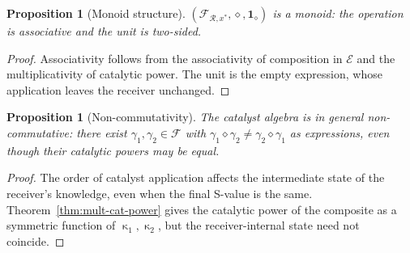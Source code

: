 \documentclass[twocolumn,11pt,a4paper]{article}
\theoremstyle{thmstyle}
\newtheorem{proposition}[theorem]{Proposition}
\theoremstyle{thmstyle}
\theoremstyle{definition}
\theoremstyle{remark}
\DeclareMathOperator{\catpow}{\kappa}
\newcommand{\Expr}{\mathcal{E}}
\newcommand{\receiver}{\mathcal{R}}
\newcommand{\Frame}{\mathcal{F}}
\begin{document}
\begin{proposition}[Monoid structure]\label{prop:monoid}
$(\Frame_{\receiver, x^{*}}, \diamond,
\mathbf{1}_{\diamond})$ is a monoid: the operation
is associative and the unit is two-sided.
\end{proposition}

\begin{proof}
Associativity follows from the associativity of
composition in $\Expr$ and the multiplicativity of
catalytic power.  The unit is the empty expression,
whose application leaves the receiver unchanged.
\end{proof}

\begin{proposition}[Non-commutativity]\label{prop:non-comm}
The catalyst algebra is in general non-commutative:
there exist $\gamma_{1}, \gamma_{2} \in \Frame$ with
$\gamma_{1} \diamond \gamma_{2} \neq \gamma_{2}
\diamond \gamma_{1}$ as expressions, even though
their catalytic powers may be equal.
\end{proposition}

\begin{proof}
The order of catalyst application affects the
intermediate state of the receiver's knowledge, even
when the final S-value is the same.
Theorem~\ref{thm:mult-cat-power} gives the catalytic
power of the composite as a symmetric function of
$\catpow_{1}, \catpow_{2}$, but the receiver-internal
state need not coincide.
\end{proof}
\end{document}
